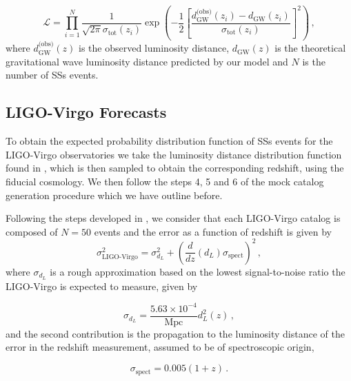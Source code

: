 \begin{equation}
    \label{eq:likelihood-gw}
    \mathcal{L} = \prod_{i=1}^N \frac{1}{\sqrt{2 \pi} \sigma_\text{tot}(z_i)} \exp \left(- \frac{1}{2} \left[ \frac{d_\text{GW}^{\text{(obs)} }(z_i) - d_{\text{GW}}(z_i)}{\sigma_\text{tot}(z_i)} \right]^2 \right) \,,
\end{equation}
where $d^\text{(obs)}_\text{GW}(z)$ is the observed luminosity distance, $d_\text{GW}(z)$ is the theoretical gravitational wave luminosity distance predicted by our model and $N$ is the number of \glspl{SS} events.


\subsection{LIGO-Virgo Forecasts}
\label{subsec:ligo-virgo}

To obtain the expected probability distribution function of \glspl{SS} events for the \gls{LIGO}-Virgo observatories we take the luminosity distance distribution function found in \cite{Lagos2019}, which is then sampled to obtain the corresponding redshift, using the fiducial cosmology. We then follow the steps 4, 5 and 6 of the mock catalog generation procedure which we have outline before.

Following the steps developed in \cite{Baker2021}, we consider that each \gls{LIGO}-Virgo catalog is composed of $N = 50$ events and the error as a function of redshift is given by
\begin{equation}
    \label{eq:LIGO-error}
    \sigma^2_\text{LIGO-Virgo} = \sigma_{d_L}^2 + \left( \frac{d}{dz}(d_L) \sigma_\text{spect} \right)^2 \,,
\end{equation}
where $\sigma_{d_L}$ is a rough approximation based on the lowest signal-to-noise ratio the \gls{LIGO}-Virgo is expected to measure, given by

\begin{equation}
    \sigma_{d_L} = \frac{5.63 \times 10^{-4}}{\text{Mpc}} d_L^2(z) \,,
\end{equation}
and the second contribution is the propagation to the luminosity distance of the error in the redshift measurement, assumed to be of spectroscopic origin,

\begin{equation}
    \sigma_\text{spect} = 0.005(1+z) \,.
\end{equation}


